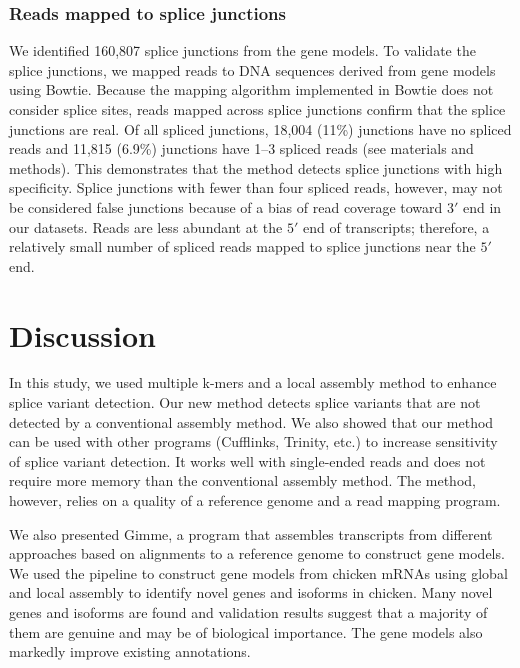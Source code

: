 \documentclass[10pt]{article}
\begin{document}
\subsubsection*{Reads mapped to splice junctions}
We identified 160,807 splice junctions from the gene models.
To validate the splice junctions, we mapped reads to DNA sequences derived from gene models using Bowtie\cite{Langmead:2009fv}.
Because the mapping algorithm implemented in Bowtie does not consider splice sites, reads mapped across splice junctions confirm that the splice junctions are real.
Of all spliced junctions, 18,004 (11\%) junctions have no spliced reads and 11,815 (6.9\%) junctions have 1--3 spliced reads (see materials and methods).
This demonstrates that the method detects splice junctions with high specificity.
Splice junctions with fewer than four spliced reads, however, may not be considered false junctions because of a bias of read coverage toward $3'$ end in our datasets.
Reads are less abundant at the $5'$ end of transcripts; therefore, a relatively small number of spliced reads mapped to splice junctions near the $5'$ end.

\section*{Discussion}

In this study, we used multiple k-mers and a local assembly method to enhance splice variant detection.
Our new method detects splice variants that are not detected by a conventional assembly method.
We also showed that our method can be used with other programs (Cufflinks, Trinity, etc.) to increase sensitivity of splice variant detection.
It works well with single-ended reads and does not require more memory than the conventional assembly method.
The method, however, relies on a quality of a reference genome and a read mapping program.

We also presented Gimme, a program that assembles transcripts from different approaches based on alignments to a reference genome to construct gene models.
We used the pipeline to construct gene models from chicken mRNAs using global and local assembly to identify novel genes and isoforms in chicken.
Many novel genes and isoforms are found and validation results suggest that a majority of them are genuine and may be of biological importance.
The gene models also markedly improve existing annotations.

\end{document}
